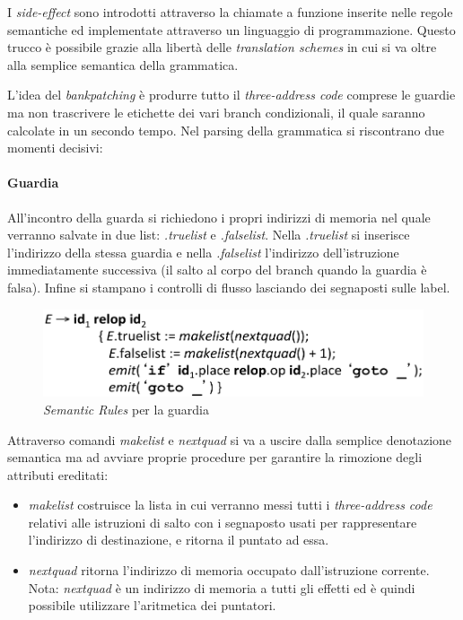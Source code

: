 I \textit{side-effect} sono introdotti attraverso la chiamate a funzione
inserite nelle regole semantiche ed implementate attraverso un linguaggio di
programmazione. Questo trucco \`e possibile grazie alla libert\`a delle
\textit{translation schemes} in cui si va oltre alla semplice semantica della
grammatica.

L'idea del \textit{bankpatching} \`e produrre tutto il
\textit{three-address code} comprese le guardie ma non trascrivere le etichette
dei vari branch condizionali, il quale saranno calcolate in un secondo tempo.
Nel parsing della grammatica si riscontrano due momenti decisivi:
\paragraph{Guardia}
All'incontro della guarda si richiedono i propri indirizzi di memoria nel
quale verranno salvate in due list: \textit{.truelist} e \textit{.falselist}.
Nella \textit{.truelist} si inserisce l'indirizzo della stessa guardia e nella
\textit{.falselist} l'indirizzo dell'istruzione immediatamente successiva
(il salto al corpo del branch quando la guardia \`e falsa). Infine si stampano
i controlli di flusso lasciando dei segnaposti sulle label.

\begin{figure}[H]
  \centering
  \includegraphics[scale=0.5]{res/image/condition_backpatching}
  \caption{\textit{Semantic Rules} per la guardia}
  \label{img:condition_backpatching}
\end{figure}

Attraverso comandi \textit{makelist} e \textit{nextquad} si va a uscire dalla
semplice denotazione semantica ma ad avviare proprie procedure per garantire
la rimozione degli attributi ereditati:
\begin{itemize}
\item \textit{makelist} costruisce la lista in cui verranno messi tutti i
\textit{three-address code} relativi alle istruzioni di salto con i segnaposto
usati per rappresentare l'indirizzo di destinazione, e ritorna il puntato ad
essa.
\item \textit{nextquad} ritorna l'indirizzo di memoria occupato dall'istruzione
corrente. Nota: \textit{nextquad} \`e un indirizzo di memoria a tutti gli
effetti ed \`e quindi possibile utilizzare l'aritmetica dei puntatori.
\end{itemize}

